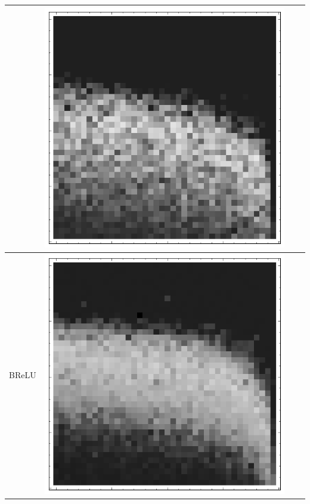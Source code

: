 \documentclass[10pt]{article}
\begin{document}
\begin{tabular}{|c|c|c|c|}
        & \includegraphics[scale=0.25]{plots/simple/LF-20R10R-20T10-CIFAR-3.png} \\ \hline
BReLU 
        & \includegraphics[scale=0.25]{plots/simple/LF-20BR10BR-20T10-CIFAR-1.png}

\end{tabular}
\end{document}
